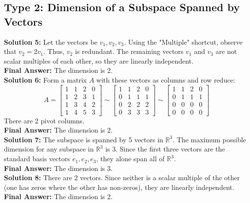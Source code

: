 \documentclass{article}
\begin{document}
\subsection*{Type 2: Dimension of a Subspace Spanned by Vectors}
\textbf{Solution 5:}
Let the vectors be $v_1, v_2, v_3$. Using the "Multiple" shortcut, observe that $v_2 = 2v_1$. Thus, $v_2$ is redundant. The remaining vectors $v_1$ and $v_3$ are not scalar multiples of each other, so they are linearly independent. \\
\textbf{Final Answer:} The dimension is 2. \\

\textbf{Solution 6:}
Form a matrix $A$ with these vectors as columns and row reduce:
$$ A = \begin{bmatrix} 1 & 1 & 2 & 0 \\ 1 & 2 & 3 & 1 \\ 1 & 3 & 4 & 2 \\ 1 & 4 & 5 & 3 \end{bmatrix} \sim \begin{bmatrix} 1 & 1 & 2 & 0 \\ 0 & 1 & 1 & 1 \\ 0 & 2 & 2 & 2 \\ 0 & 3 & 3 & 3 \end{bmatrix} \sim \begin{bmatrix} 1 & 1 & 2 & 0 \\ 0 & 1 & 1 & 1 \\ 0 & 0 & 0 & 0 \\ 0 & 0 & 0 & 0 \end{bmatrix} $$
There are 2 pivot columns. \\
\textbf{Final Answer:} The dimension is 2. \\

\textbf{Solution 7:}
The subspace is spanned by 5 vectors in $\mathbb{R}^3$. The maximum possible dimension for any subspace in $\mathbb{R}^3$ is 3. Since the first three vectors are the standard basis vectors $e_1, e_2, e_3$, they alone span all of $\mathbb{R}^3$. \\
\textbf{Final Answer:} The dimension is 3. \\

\textbf{Solution 8:}
There are 2 vectors. Since neither is a scalar multiple of the other (one has zeros where the other has non-zeros), they are linearly independent. \\
\textbf{Final Answer:} The dimension is 2. \\
\end{document}
